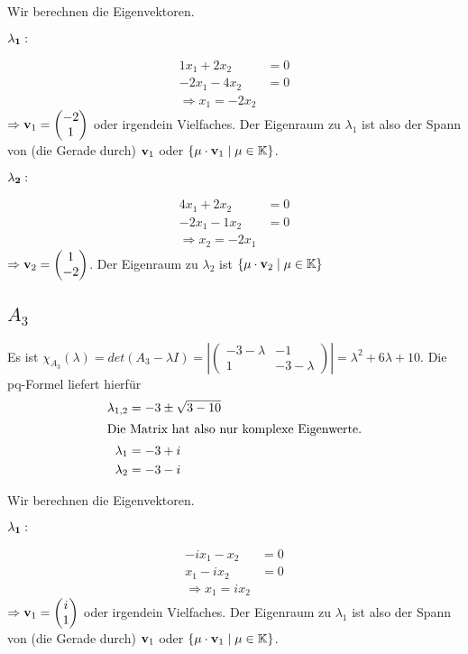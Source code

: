 \documentclass{../mfa}
\begin{document}
Wir berechnen die Eigenvektoren.

$\mathbf{\lambda_1:}$
\par 
\begin{align*}
   1x_1 + 2x_2 &= 0 \\
   -2x_1  -4x_2 &= 0 \\
   \Rightarrow x_1 = -2x_2
\end{align*}
$\Rightarrow \v{1} = \begin{pmatrix} -2 \\ 1 \end{pmatrix}$ oder irgendein Vielfaches. Der Eigenraum zu $\lambda_1$ ist
also der Spann von (die Gerade durch) $\v{1}$ oder $\{\mu \cdot \v{1} \mid \mu
\in \mathbb{K}\}$.

$\mathbf{\lambda_2:}$
\par 
\begin{align*}
   4x_1 + 2x_2 &= 0 \\
   -2x_1 -1x_2 &= 0 \\
   \Rightarrow x_2 = -2x_1
\end{align*}
$\Rightarrow \v{2} = \begin{pmatrix} 1 \\ -2 \end{pmatrix}$. Der Eigenraum zu
   $\lambda_2$ ist $\{\mu \cdot \v{2} \mid \mu \in \mathbb{K}\}$

\subsection{$A_3$}

Es ist $\chi_{A_3}(\lambda) = det(A_3 - \lambda I) = 
\left|
\begin{pmatrix}
   -3-\lambda & -1 \\
   1 & -3 - \lambda
\end{pmatrix}
\right|= \lambda^2 +6\lambda + 10$. Die
pq-Formel liefert hierfür
\begin{align*}
   \lambda_{1,2} & = -3 \pm \sqrt{3 - 10} \\
   \intertext{Die Matrix hat also nur komplexe Eigenwerte.}
   \lambda_1     & = -3 + i                                        \\
   \lambda_2     & = -3 -i                                       \\
\end{align*}

Wir berechnen die Eigenvektoren.

$\mathbf{\lambda_1:}$
\par 
\begin{align*}
   -ix_1  -x_2 &= 0 \\
   x_1  -ix_2 &= 0 \\
   \Rightarrow x_1 = ix_2
\end{align*}
$\Rightarrow \v{1} = \begin{pmatrix} i \\ 1 \end{pmatrix}$ oder irgendein
   Vielfaches. Der Eigenraum zu $\lambda_1$ ist also der Spann von (die Gerade
   durch) $\v{1}$ oder $\{\mu \cdot \v{1} \mid \mu \in \mathbb{K}\}$.
\end{document}
